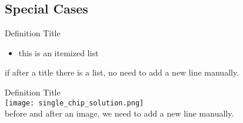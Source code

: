 \subsection{Special Cases}

\begin{definition}{Definition Title}
    \begin{itemize}
        \item this is an itemized list
    \end{itemize}
    if after a title there is a list, no need to add a new line manually.
\end{definition}

\begin{definition}{Definition Title}
    \\
    \texttt{[image: single\_chip\_solution.png]}
    \\
    before and after an image, we need to add a new line manually. 
\end{definition}




